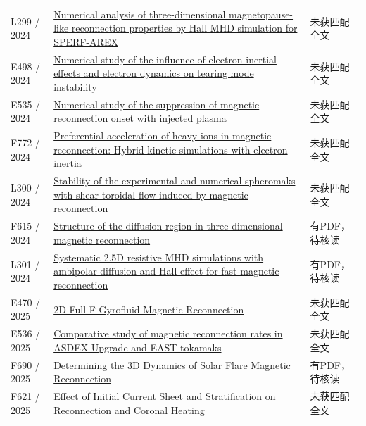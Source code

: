 \documentclass[UTF8,a4paper,11pt,openany,fontset=fandol]{ctexbook}
\begin{document}
\begin{longtable}{P{24mm}P{97mm}P{27mm}}
L299 / 2024 & \href{https://doi.org/10.1063/5.0213566}{Numerical analysis of three-dimensional magnetopause-like reconnection properties by Hall MHD simulation for SPERF-AREX} & 未获匹配全文\\

E498 / 2024 & \href{https://doi.org/10.1088/1361-6587/ad4e66}{Numerical study of the influence of electron inertial effects and electron dynamics on tearing mode instability} & 未获匹配全文\\

E535 / 2024 & \href{https://doi.org/10.1063/5.0186879}{Numerical study of the suppression of magnetic reconnection onset with injected plasma} & 未获匹配全文\\

F772 / 2024 & \href{https://doi.org/10.1051/0004-6361/202348573}{Preferential acceleration of heavy ions in magnetic reconnection: Hybrid-kinetic simulations with electron inertia} & 未获匹配全文\\

L300 / 2024 & \href{https://doi.org/10.1088/1361-6587/ada1f9}{Stability of the experimental and numerical spheromaks with shear toroidal flow induced by magnetic reconnection} & 未获匹配全文\\

F615 / 2024 & \href{https://doi.org/10.58088/x3fm-h327}{Structure of the diffusion region in three dimensional magnetic reconnection} & 有PDF，待核读\\

L301 / 2024 & \href{https://doi.org/10.1016/j.physleta.2024.129897}{Systematic 2.5D resistive MHD simulations with ambipolar diffusion and Hall effect for fast magnetic reconnection} & 有PDF，待核读\\

E470 / 2025 & \href{https://resolver.obvsg.at/urn:nbn:at:at-ubi:1-175860}{2D Full-F Gyrofluid Magnetic Reconnection} & 未获匹配全文\\

E536 / 2025 & \href{https://doi.org/10.1063/5.0243286}{Comparative study of magnetic reconnection rates in ASDEX Upgrade and EAST tokamaks} & 未获匹配全文\\

F690 / 2025 & \href{https://doi.org/10.3847/1538-4357/ae03c5}{Determining the 3D Dynamics of Solar Flare Magnetic Reconnection} & 有PDF，待核读\\

F621 / 2025 & \href{https://doi.org/10.3847/1538-4357/adfedd}{Effect of Initial Current Sheet and Stratification on Reconnection and Coronal Heating} & 未获匹配全文\\


\end{longtable}
\end{document}
